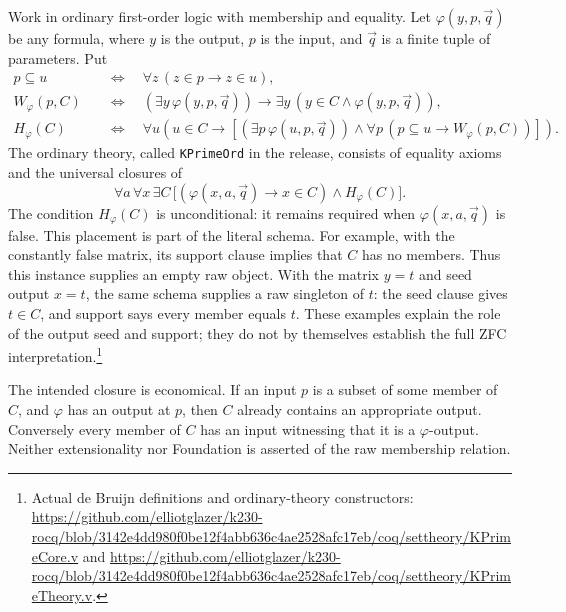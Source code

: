 Work in ordinary first-order logic with membership and equality.  Let
$\varphi(y,p,\vec q)$ be any formula, where $y$ is the output, $p$ is
the input, and $\vec q$ is a finite tuple of parameters.  Put
\begin{align*}
 p\subseteq u &\quad\Longleftrightarrow\quad
       \forall z\,(z\in p\longrightarrow z\in u),\\
 W_\varphi(p,C)&\quad\Longleftrightarrow\quad
       (\exists y\,\varphi(y,p,\vec q))\longrightarrow
       \exists y\,(y\in C\land\varphi(y,p,\vec q)),\\
 H_\varphi(C)&\quad\Longleftrightarrow\quad
       \forall u\left(u\in C\longrightarrow
       \left[(\exists p\,\varphi(u,p,\vec q))\land
       \forall p\,(p\subseteq u\longrightarrow W_\varphi(p,C))\right]\right).
\end{align*}
The ordinary theory, called \texttt{KPrimeOrd} in the release, consists
of equality axioms and the universal closures of
\begin{equation}
 \forall a\,\forall x\,\exists C\,
       \bigl[(\varphi(x,a,\vec q)\longrightarrow x\in C)
                     \land H_\varphi(C)\bigr].
 \label{eq:kprime-schema}
\end{equation}
The condition $H_\varphi(C)$ is unconditional: it remains required when
$\varphi(x,a,\vec q)$ is false.  This placement is part of the literal
schema.  For example, with the constantly false matrix, its support
clause implies that $C$ has no members.  Thus this instance supplies an
empty raw object.  With the matrix $y=t$ and seed output $x=t$, the
same schema supplies a raw singleton of $t$: the seed clause gives
$t\in C$, and support says every member equals $t$.
These examples explain the role of the output seed and support; they
do not by themselves establish the full ZFC interpretation.\footnote{Actual
de Bruijn definitions and ordinary-theory constructors:
\url{https://github.com/elliotglazer/k230-rocq/blob/3142e4dd980f0be12f4abb636c4ae2528afc17eb/coq/settheory/KPrimeCore.v}
and
\url{https://github.com/elliotglazer/k230-rocq/blob/3142e4dd980f0be12f4abb636c4ae2528afc17eb/coq/settheory/KPrimeTheory.v}.}

The intended closure is economical.  If an input $p$ is a subset of
some member of $C$, and $\varphi$ has an output at $p$, then $C$ already
contains an appropriate output.  Conversely every member of $C$ has an
input witnessing that it is a $\varphi$-output.  Neither extensionality
nor Foundation is asserted of the raw membership relation.

